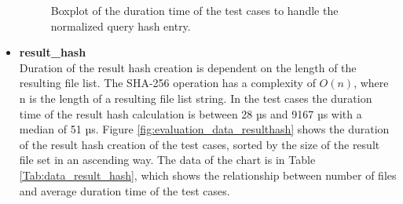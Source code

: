 \documentclass[draft,final]{vutinfth} %
\begin{document}
\begin{itemize}
	\begin{figure}[!h]
		\centering
		\caption{Boxplot of the duration time of the test cases to handle the normalized query hash entry.}
		\label{fig:evaluation_perf_norm_hash}
	\end{figure}
	\item \textbf{result\_hash} \\
	Duration of the result hash creation is dependent on the length of the resulting file list. The SHA-256 operation has a complexity of $O(n)$, where n is the length of a resulting file list string. In the test cases the duration time of the result hash calculation is between 28 µs and 9167 µs with a median of 51 µs. Figure \ref{fig:evaluation_data_resulthash} shows the duration of the result hash creation of the test cases, sorted by the size of the result file set in an ascending way. The data of the chart is in Table \ref{Tab:data_result_hash}, which shows the relationship between number of files and average duration time of the test cases.  
	

\end{itemize}
\end{document}
